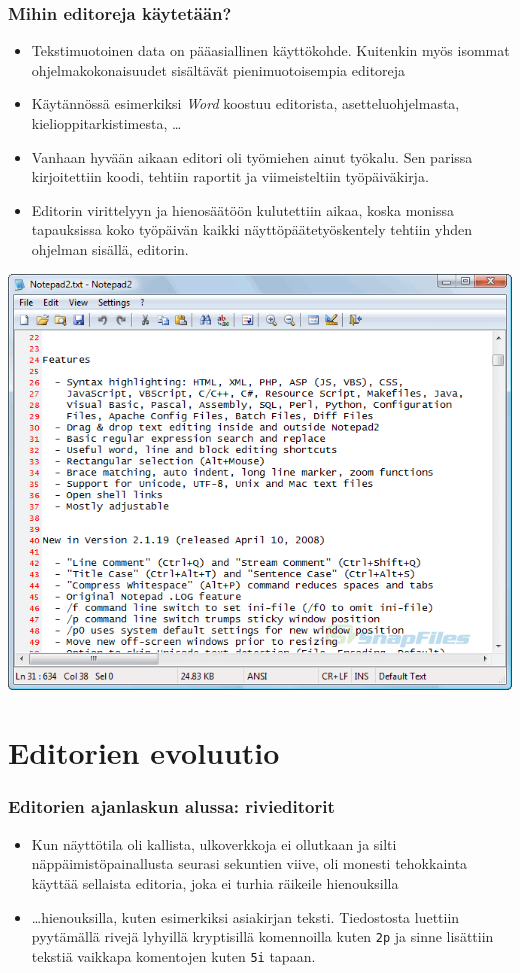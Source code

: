 \documentclass[]{beamer}
\newcommand{\Gohj}[1]{\emph{#1}}
\newcommand{\code}[1]{\texttt{#1}}
\begin{document}
\begin{frame}
  \frametitle{Mihin editoreja käytetään?}
  \begin{itemize}
    \item Tekstimuotoinen data on pääasiallinen käyttökohde. Kuitenkin myös isommat ohjelmakokonaisuudet sisältävät pienimuotoisempia editoreja
    \item Käytännössä esimerkiksi \Gohj{Word} koostuu editorista, asetteluohjelmasta, kielioppitarkistimesta, \ldots
    \pause
    \item Vanhaan hyvään aikaan editori oli työmiehen ainut työkalu. Sen parissa kirjoitettiin koodi, tehtiin raportit ja viimeisteltiin työpäiväkirja.
    \item Editorin virittelyyn ja hienosäätöön kulutettiin aikaa, koska monissa tapauksissa koko työpäivän kaikki näyttöpäätetyöskentely tehtiin yhden ohjelman sisällä, editorin.
  \end{itemize}
\end{frame}

\begin{frame}[plain]
  \includegraphics[width=\textwidth]{notepad2}
\end{frame}

\section{Editorien evoluutio}

\begin{frame}
  \frametitle{Editorien ajanlaskun alussa: rivieditorit}
  \begin{itemize}
    \item Kun näyttötila oli kallista, ulkoverkkoja ei ollutkaan ja silti näppäimistöpainallusta seurasi sekuntien viive, oli monesti tehokkainta käyttää sellaista editoria, joka ei turhia räikeile hienouksilla
    \pause
    \item \ldots hienouksilla, kuten esimerkiksi asiakirjan teksti. Tiedostosta luettiin pyytämällä rivejä lyhyillä kryptisillä komennoilla kuten \code{2p} ja sinne lisättiin tekstiä vaikkapa komentojen kuten \code{5i} tapaan.
\end{itemize}
\end{frame}
\end{document}
